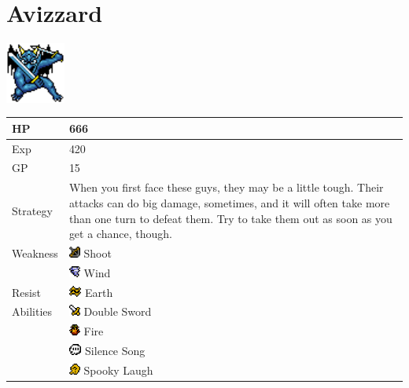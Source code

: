 \section{Avizzard}
\label{monster:avizzard}

\includegraphics[height=2cm,keepaspectratio]{./resources/monster/avizzard}

\begin{longtable}{ l p{9cm} }
	HP
	& 666
\\ \hline
	Exp
	& 420
\\ \hline
	GP
	& 15
\\ \hline
	Strategy
	& When you first face these guys, they may be a little tough. Their attacks can do big damage, sometimes, and it will often take more than one turn to defeat them. Try to take them out as soon as you get a chance, though.
\\ \hline
	Weakness
	& \includegraphics[height=1em,keepaspectratio]{./resources/effects/shoot} Shoot \\
	& \includegraphics[height=1em,keepaspectratio]{./resources/effects/wind} Wind
\\ \hline
	Resist
	& \includegraphics[height=1em,keepaspectratio]{./resources/effects/earth} Earth
\\ \hline
	Abilities
	& \includegraphics[height=1em,keepaspectratio]{./resources/effects/damage} Double Sword \\
	& \includegraphics[height=1em,keepaspectratio]{./resources/effects/fire} Fire \\
	& \includegraphics[height=1em,keepaspectratio]{./resources/effects/silence} Silence Song \\
	& \includegraphics[height=1em,keepaspectratio]{./resources/effects/confusion} Spooky Laugh
\end{longtable}

